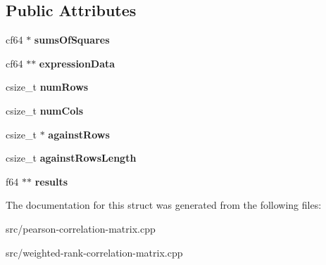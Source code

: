 \subsection*{Public Attributes}
\begin{DoxyCompactItemize}
\item 
\mbox{\label{structcorrHelpStructCrossReference_aafd598ebfa0734685ae891ed2306b78d}} 
cf64 $\ast$ {\bfseries sums\+Of\+Squares}
\item 
\mbox{\label{structcorrHelpStructCrossReference_a720074c2fe577537776bd423badbfd02}} 
cf64 $\ast$$\ast$ {\bfseries expression\+Data}
\item 
\mbox{\label{structcorrHelpStructCrossReference_a8915b3bf6686d0253996f3c6ec621c65}} 
csize\+\_\+t {\bfseries num\+Rows}
\item 
\mbox{\label{structcorrHelpStructCrossReference_af6ecc2f0e2191824f939747725f9edd1}} 
csize\+\_\+t {\bfseries num\+Cols}
\item 
\mbox{\label{structcorrHelpStructCrossReference_a049d0b50801f8bea48034a80a376adf6}} 
csize\+\_\+t $\ast$ {\bfseries against\+Rows}
\item 
\mbox{\label{structcorrHelpStructCrossReference_a7f0def370016ca8e6702097caba1906c}} 
csize\+\_\+t {\bfseries against\+Rows\+Length}
\item 
\mbox{\label{structcorrHelpStructCrossReference_ac43c5b1440fdeef2da8c5676918f56fa}} 
f64 $\ast$$\ast$ {\bfseries results}
\end{DoxyCompactItemize}


The documentation for this struct was generated from the following files\+:\begin{DoxyCompactItemize}
\item 
src/pearson-\/correlation-\/matrix.\+cpp\item 
src/weighted-\/rank-\/correlation-\/matrix.\+cpp\end{DoxyCompactItemize}
